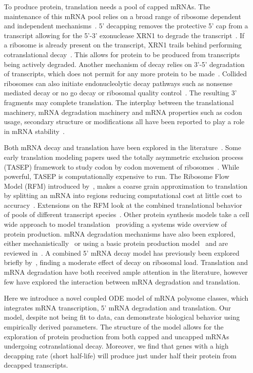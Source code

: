 \documentclass[10pt,letterpaper]{article}
\begin{document}
To produce protein, translation needs a pool of capped mRNAs. The maintenance of this mRNA pool relies on a broad range of ribosome dependent and independent mechanisms~\cite{RN3}. 5' decapping removes the protective 5' cap from a transcript allowing for the 5'-3' exonuclease XRN1 to degrade the transcript~\cite{RN3}. If a ribosome is already present on the transcript, XRN1 trails behind performing cotranslational decay~\cite{RN4}. This allows for protein to be produced from transcripts being actively degraded. Another mechanism of decay relies on 3'-5' degradation of transcripts, which does not permit for any more protein to be made~\cite{RN5}. Collided ribosomes can also initiate endonucleolytic decay pathways such as nonsense mediated decay or no go decay or ribosomal quality control~\cite{RN6,RN7}. The resulting 3' fragments may complete translation. The interplay between the translational machinery, mRNA degradation machinery and mRNA properties such as codon usage, secondary structure or modifications all have been reported to play a role in mRNA stability~\cite{RN8, RN9, RN10}.


Both mRNA decay and translation have been explored in the literature~\cite{RN11, RN12}. Some early translation modeling papers used the totally asymmetric exclusion process (TASEP) framework to study codon by codon movement of ribosomes~\cite{RN13,RN14}. While powerful, TASEP is computationally expensive to run. The Ribosome Flow Model (RFM) introduced by~\cite{RN15}, makes a coarse grain approximation to translation by splitting an mRNA into regions reducing computational cost at little cost to accuracy~\cite{RN15}. Extensions on the RFM look at the combined translational behavior of pools of different transcript species~\cite{RN16}. Other protein synthesis models take a cell wide approach to model translation~\cite{RN17} providing a systems wide overview of protein production. mRNA degradation mechanisms have also been explored, either mechanistically~\cite{RN18,RN19} or using a basic protein production model~\cite{RN20} and are reviewed in~\cite{RN21,RN22}. A combined 5' mRNA decay model has previously been explored briefly by~\cite{RN22}, finding a moderate effect of decay on ribosomal load. Translation and mRNA degradation have both received ample attention in the literature, however few have explored the interaction between mRNA degradation and translation.


Here we introduce a novel coupled ODE model of mRNA polysome classes, which integrates mRNA transcription, 5' mRNA degradation and translation. Our model, despite not being fit to data, can demonstrate biological behavior using empirically derived parameters. The structure of the model allows for the exploration of protein production from both capped and uncapped mRNAs undergoing cotranslational decay. Moreover, we find that genes with a high decapping rate (short half-life) will produce just under half their protein from decapped transcripts. 
\end{document}
